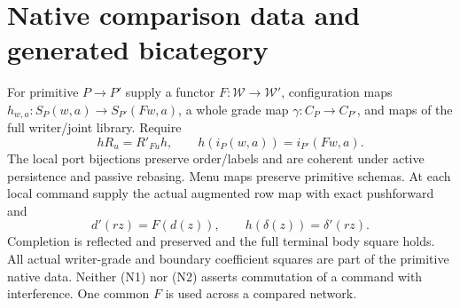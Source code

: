 \documentclass[11pt]{article}
\begin{document}
\section{Native comparison data and generated bicategory}
For primitive $P\to P'$ supply a functor $F:\mathcal W\to\mathcal W'$, configuration maps $h_{w,a}:S_P(w,a)\to S_{P'}(Fw,a)$, a whole grade map $\gamma:C_P\to C_{P'}$, and maps of the full writer/joint library. Require
\[
 hR_u=R'_{Fu}h,\qquad h(i_P(w,a))=i_{P'}(Fw,a).          \tag{N1}
\]
The local port bijections preserve order/labels and are coherent under active persistence and passive rebasing. Menu maps preserve primitive schemas. At each local command supply the actual augmented row map with exact pushforward and
\[
 d'(rz)=F(d(z)),\qquad h(\delta(z))=\delta'(rz).         \tag{N2}
\]
Completion is reflected and preserved and the full terminal body square holds. All actual writer-grade and boundary coefficient squares are part of the primitive native data. Neither (N1) nor (N2) asserts commutation of a command with interference. One common $F$ is used across a compared network.
\end{document}
